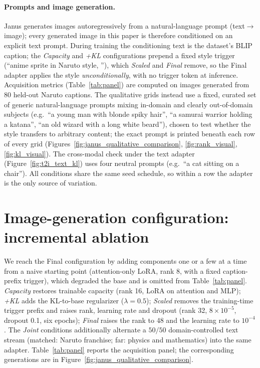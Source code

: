 \documentclass{article}
\begin{document}
\paragraph{Prompts and image generation.}
Janus generates images autoregressively from a natural-language prompt
(text$\to$image); every generated image in this paper is therefore conditioned on
an explicit text prompt. During training the conditioning text is the dataset's
BLIP caption; the \textit{Capacity} and \textit{+KL} configurations prepend a
fixed style trigger (``anime sprite in Naruto style, ''), which \textit{Scaled}
and \textit{Final} remove, so the Final adapter applies the style
\emph{unconditionally}, with no trigger token at inference. Acquisition metrics
(Table~\ref{tab:panel}) are computed on images generated from $80$ held-out Naruto
captions. The qualitative grids instead use a fixed, curated set of generic
natural-language prompts mixing in-domain and clearly out-of-domain subjects
(e.g.\ ``a young man with blonde spiky hair'', ``a samurai warrior holding a
katana'', ``an old wizard with a long white beard''), chosen to test whether the
style transfers to arbitrary content; the exact prompt is printed beneath each row
of every grid (Figures~\ref{fig:janus_qualitative_comparison},
\ref{fig:rank_visual}, \ref{fig:kl_visual}). The cross-modal check under the text
adapter (Figure~\ref{fig:t2i_text_kl}) uses four neutral prompts (e.g.\ ``a cat
sitting on a chair''). All conditions share the same seed schedule, so within a
row the adapter is the only source of variation.


\section{Image-generation configuration: incremental ablation}
\label{app:recipe}
We reach the Final configuration by adding components one or a few at a time from
a naive starting point (attention-only LoRA, rank 8, with a fixed caption-prefix
trigger), which degraded the base and is omitted from Table~\ref{tab:panel}.
\textit{Capacity} restores trainable capacity (rank 16, LoRA on attention and
MLP); \textit{+KL} adds the KL-to-base regularizer ($\lambda{=}0.5$);
\textit{Scaled} removes the training-time trigger prefix and raises rank, learning
rate and dropout (rank 32, $8\times10^{-5}$, dropout 0.1, six epochs);
\textit{Final} raises the rank to 48 and the learning rate to $10^{-4}$. The
\textit{Joint} conditions additionally alternate a $50/50$ domain-controlled text
stream (matched: Naruto franchise; far: physics and mathematics) into the same
adapter. Table~\ref{tab:panel} reports the acquisition panel; the corresponding
generations are in Figure~\ref{fig:janus_qualitative_comparison}.
\end{document}
